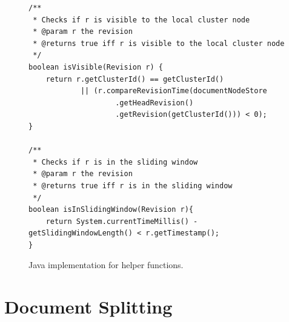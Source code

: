 \documentclass[abstracton,12pt]{scrreprt}
\begin{document}
\begin{figure}[h]
    \begin{framed}
        \begin{scriptsize}
            \begin{verbatim}
/**
 * Checks if r is visible to the local cluster node
 * @param r the revision
 * @returns true iff r is visible to the local cluster node
 */
boolean isVisible(Revision r) {
    return r.getClusterId() == getClusterId()
            || (r.compareRevisionTime(documentNodeStore
                    .getHeadRevision()
                    .getRevision(getClusterId())) < 0);
}

/**
 * Checks if r is in the sliding window
 * @param r the revision
 * @returns true iff r is in the sliding window
 */
boolean isInSlidingWindow(Revision r){
    return System.currentTimeMillis() - getSlidingWindowLength() < r.getTimestamp();
}
            \end{verbatim}
        \end{scriptsize}
    \end{framed}
    \caption{Java implementation for helper functions.}
    \label{algo:helper_functions}
\end{figure}

\section{Document Splitting}
\end{document}
